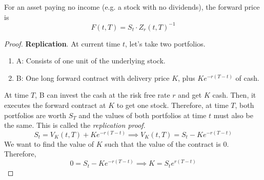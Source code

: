 \documentclass{article}
\begin{document}
    \begin{theorem}
      \label{thm:forward-price-of-no-income-asset}
      For an asset paying no income (e.g. a stock with no dividends), the forward price is 
      \begin{equation}
        F(t, T) = S_t \cdot Z_r (t, T)^{-1}
      \end{equation} 
    \end{theorem}
    \begin{proof}
      \textbf{Replication}. At current time $t$, let's take two portfolios. 
      \begin{enumerate}
        \item A: Consists of one unit of the underlying stock. 
        \item B: One long forward contract with delivery price $K$, plus $K e^{-r(T - t)}$ of cash. 
      \end{enumerate}
      At time $T$, B can invest the cash at the risk free rate $r$ and get $K$ cash. Then, it executes the forward contract at $K$ to get one stock. Therefore, at time $T$, both portfolios are worth $S_T$ and the values of both portfolios at time $t$ must also be the same. This is called the \textit{replication proof}. 
      \begin{equation}
        S_t = V_K (t, T) + K e^{-r (T - t)} \implies V_K (t, T)= S_t - K e^{-r (T - t)}
      \end{equation}
      We want to find the value of $K$ such that the value of the contract is $0$. Therefore, 
      \begin{equation}
        0 = S_t - K e^{-r (T - t)} \implies K = S_t e^{r (T - t)}
      \end{equation}
    \end{proof}
\end{document}
